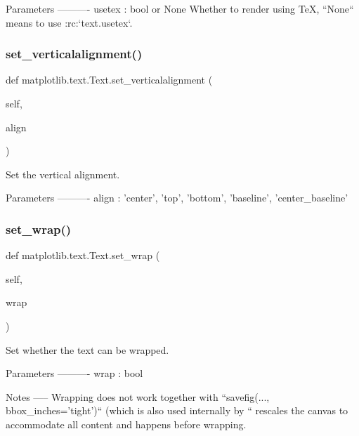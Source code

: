 \begin{DoxyVerb}Parameters
----------
usetex : bool or None
    Whether to render using TeX, ``None`` means to use
    :rc:`text.usetex`.
\end{DoxyVerb}
 \mbox{\label{classmatplotlib_1_1text_1_1Text_a0d73ddae6df696dc0a2cb8077ac2abb5}} 
\subsubsection{\texorpdfstring{set\+\_\+verticalalignment()}{set\_verticalalignment()}}
{\footnotesize\ttfamily def matplotlib.\+text.\+Text.\+set\+\_\+verticalalignment (\begin{DoxyParamCaption}\item[{}]{self,  }\item[{}]{align }\end{DoxyParamCaption})}

\begin{DoxyVerb}Set the vertical alignment.

Parameters
----------
align : {'center', 'top', 'bottom', 'baseline', 'center_baseline'}
\end{DoxyVerb}
 \mbox{\label{classmatplotlib_1_1text_1_1Text_a1758ca7ed386fc6774fdeb2be1196d8e}} 
\subsubsection{\texorpdfstring{set\+\_\+wrap()}{set\_wrap()}}
{\footnotesize\ttfamily def matplotlib.\+text.\+Text.\+set\+\_\+wrap (\begin{DoxyParamCaption}\item[{}]{self,  }\item[{}]{wrap }\end{DoxyParamCaption})}

\begin{DoxyVerb}Set whether the text can be wrapped.

Parameters
----------
wrap : bool

Notes
-----
Wrapping does not work together with
``savefig(..., bbox_inches='tight')`` (which is also used internally
by ``%
rescales the canvas to accommodate all content and happens before
wrapping.
\end{DoxyVerb}
 \mbox{\label{classmatplotlib_1_1text_1_1Text_a1a34601df138416a8d6e70b70b75f5f3}} 

